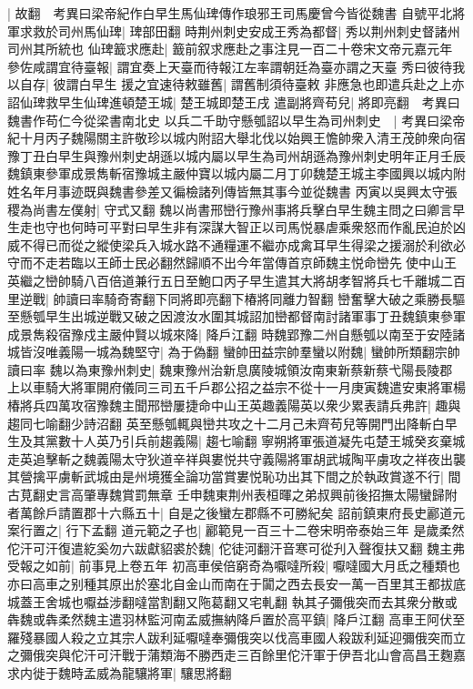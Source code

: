 |{
	故翻　考異曰梁帝紀作白早生馬仙琕傳作琅邪王司馬慶曾今皆從魏書}
自號平北將軍求救於司州馬仙琕|{
	琕部田翻}
時荆州刺史安成王秀為都督|{
	秀以荆州刺史督諸州司州其所統也}
仙琕籖求應赴|{
	籖前叙求應赴之事注見一百二十卷宋文帝元嘉元年}
參佐咸謂宜待臺報|{
	謂宜奏上天臺而待報江左率謂朝廷為臺亦謂之天臺}
秀曰彼待我以自存|{
	彼謂白早生}
援之宜速待敕雖舊|{
	謂舊制須待臺敕}
非應急也即遣兵赴之上亦詔仙琕救早生仙琕進頓楚王城|{
	楚王城即楚王戌}
遣副將齊苟兒|{
	將即亮翻　考異曰魏書作苟仁今從梁書南北史}
以兵二千助守懸瓠詔以早生為司州刺史　|{
	考異曰梁帝紀十月丙子魏陽關主許敬珍以城内附詔大舉北伐以始興王憺帥衆入清王茂帥衆向宿豫丁丑白早生與豫州刺史胡遜以城内屬以早生為司州胡遜為豫州刺史明年正月壬辰魏鎮東參軍成景雋斬宿豫城主嚴仲寶以城内屬二月丁卯魏楚王城主李國興以城内附姓名年月事迹既與魏書參差又徧檢諸列傳皆無其事今並從魏書}
丙寅以吳興太守張稷為尚書左僕射|{
	守式又翻}
魏以尚書邢巒行豫州事將兵擊白早生魏主問之曰卿言早生走也守也何時可平對曰早生非有深謀大智正以司馬悦暴虐乘衆怒而作亂民迫於凶威不得已而從之縱使梁兵入城水路不通糧運不繼亦成禽耳早生得梁之援溺於利欲必守而不走若臨以王師士民必翻然歸順不出今年當傳首京師魏主悦命巒先使中山王英繼之巒帥騎八百倍道兼行五日至鮑口丙子早生遣其大將胡孝智將兵七千離城二百里逆戰|{
	帥讀曰率騎奇寄翻下同將即亮翻下椿將同離力智翻}
巒奮擊大破之乘勝長驅至懸瓠早生出城逆戰又破之因渡汝水圍其城詔加巒都督南討諸軍事丁丑魏鎮東參軍成景雋殺宿豫戍主嚴仲賢以城來降|{
	降戶江翻}
時魏郢豫二州自懸瓠以南至于安陸諸城皆沒唯義陽一城為魏堅守|{
	為于偽翻}
蠻帥田益宗帥羣蠻以附魏|{
	蠻帥所類翻宗帥讀曰率}
魏以為東豫州刺史|{
	魏東豫州治新息廣陵城領汝南東新蔡新蔡弋陽長陵郡}
上以車騎大將軍開府儀同三司五千戶郡公招之益宗不從十一月庚寅魏遣安東將軍楊椿將兵四萬攻宿豫魏主聞邢巒屢捷命中山王英趣義陽英以衆少累表請兵弗許|{
	趣與趨同七喻翻少詩沼翻}
英至懸瓠輒與巒共攻之十二月己未齊苟兒等開門出降斬白早生及其黨數十人英乃引兵前趨義陽|{
	趨七喻翻}
寧朔將軍張道凝先屯楚王城癸亥棄城走英追擊斬之魏義陽太守狄道辛祥與婁悦共守義陽將軍胡武城陶平虜攻之祥夜出襲其營擒平虜斬武城由是州境獲全論功當賞婁悦恥功出其下間之於執政賞遂不行|{
	間古莧翻史言高肇專魏賞罰無章}
壬申魏東荆州表桓暉之弟叔興前後招撫太陽蠻歸附者萬餘戶請置郡十六縣五十|{
	自是之後蠻左郡縣不可勝紀矣}
詔前鎮東府長史酈道元案行置之|{
	行下孟翻}
道元範之子也|{
	酈範見一百三十二卷宋明帝泰始三年}
是歲柔然佗汗可汗復遣紇奚勿六跋獻貂裘於魏|{
	佗徒河翻汗音寒可從刋入聲復扶又翻}
魏主弗受報之如前|{
	前事見上卷五年}
初高車侯倍窮奇為嚈噠所殺|{
	嚈噠國大月氐之種類也亦曰高車之别種其原出於塞北自金山而南在于闐之西去長安一萬一百里其王都拔底城蓋王舍城也嚈益涉翻噠當割翻又陁葛翻又宅軋翻}
執其子彌俄突而去其衆分散或犇魏或犇柔然魏主遣羽林監河南孟威撫納降戶置於高平鎮|{
	降戶江翻}
高車王阿伏至羅殘暴國人殺之立其宗人跋利延嚈噠奉彌俄突以伐高車國人殺跋利延迎彌俄突而立之彌俄突與佗汗可汗戰于蒲類海不勝西走三百餘里佗汗軍于伊吾北山會高昌王麴嘉求内徙于魏時孟威為龍驤將軍|{
	驤思將翻}
